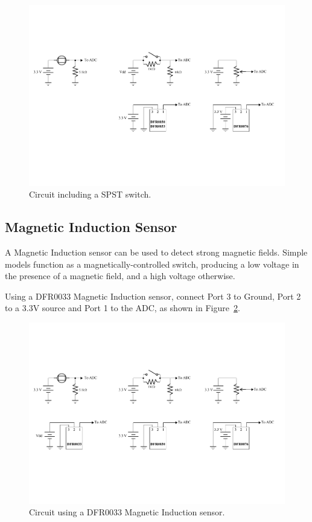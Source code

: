 \documentclass[11pt, twoside, pdftex]{article}
\begin{document}
\begin{figure} [H]
\begin{center}
\includegraphics{figures/switch.pdf}
\end{center}
\caption{Circuit including a SPST switch.}
\label{fig:switch}
\end{figure}

\subsection{Magnetic Induction Sensor}
A Magnetic Induction sensor can be used to detect strong magnetic fields. Simple models function as a magnetically-controlled switch, producing a low voltage in the presence of a magnetic field, and a high voltage otherwise.

Using a {\sf DFR0033} Magnetic Induction sensor, connect Port 3 to Ground, Port 2 to a 3.3V source and Port 1 to the ADC, as shown in Figure~\ref{fig:magnet}.
\begin{figure} [H]
\begin{center}
\includegraphics{figures/mag_sensor.pdf}
\end{center}
\caption{Circuit using a DFR0033 Magnetic Induction sensor.}
\label{fig:magnet}
\end{figure}
\end{document}

